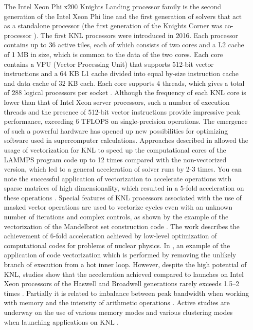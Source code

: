 \documentclass[
11pt,%
tightenlines,%
twoside,%
onecolumn,%
nofloats,%
nobibnotes,%
nofootinbib,%
superscriptaddress,%
noshowpacs,%
centertags]%
{revtex4}
\begin{document}
The Intel Xeon Phi x200 Knights Landing processor family is the second generation of the Intel Xeon Phi line and the first generation of solvers that act as a standalone processor (the first generation of the Knights Corner was co-processor \cite{Dorris}).
The first KNL processors were introduced in 2016. 
Each processor contains up to 36 active tiles, each of which consists of two cores and a L2 cache of 1 MB in size, which is common to the data of the two cores. 
Each core contains a VPU (Vector Processing Unit) that supports 512-bit vector instructions and a 64 KB L1 cache divided into equal by-size instruction cache and data cache of 32 KB each. 
Each core supports 4 threads, which gives a total of 288 logical processors per socket \cite{Tobin}. 
Although the frequency of each KNL core is lower than that of Intel Xeon server processors, such a number of execution threads and the presence of 512-bit vector instructions provide impressive peak performance, exceeding 6 TFLOPS on single-precision operations.
The emergence of such a powerful hardware has opened up new possibilities for optimizing software used in supercomputer calculations. 
Approaches described in \cite{McDoniel} allowed the usage of vectorization for KNL to speed up the computational cores of the LAMMPS program code up to 12 times compared with the non-vectorized version, which led to a general acceleration of solver runs by 2-3 times. 
You can note the successful application of vectorization to accelerate operations with sparse matrices of high dimensionality, which resulted in a 5-fold acceleration on these operations \cite{Malas}. 
Special features of KNL processors associated with the use of masked vector operations are used to vectorize cycles even with an unknown number of iterations and complex controls, as shown by the example of the vectorization of the Mandelbrot set construction code \cite{Krzikalla}. 
The work \cite{Cook} describes the achievement of 6-fold acceleration achieved by low-level optimization of computational codes for problems of nuclear physics. 
In \cite{Rybakov_Optimization}, an example of the application of code vectorization which is performed by removing the unlikely branch of execution from a hot inner loop.
However, despite the high potential of KNL, studies show that the acceleration achieved compared to launches on Intel Xeon processors of the Haswell and Broadwell generations rarely exceeds 1.5--2 times \cite{Sengupta,Kronbichler}. 
Partially it is related to imbalance between peak bandwidth when working with memory and the intensity of arithmetic operations \cite{Doerfler}. 
Active studies are underway on the use of various memory modes and various clustering modes when launching applications on KNL \cite{Rosales}.
\end{document}
